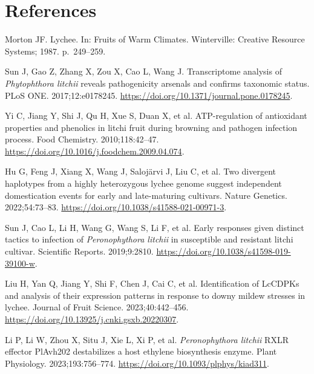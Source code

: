 \documentclass[referee,pdflatex,sn-basic,Numbered]{sn-jnl}
\begin{document}
\section*{References}

\begin{enumerate}[label={[\arabic*]},itemsep=2pt,leftmargin=2.6em]
\item Morton JF. Lychee. In: Fruits of Warm Climates. Winterville: Creative Resource Systems; 1987. p.~249--259.

\item Sun J, Gao Z, Zhang X, Zou X, Cao L, Wang J. Transcriptome analysis of \textit{Phytophthora litchii} reveals pathogenicity arsenals and confirms taxonomic status. PLoS ONE. 2017;12:e0178245. \url{https://doi.org/10.1371/journal.pone.0178245}.

\item Yi C, Jiang Y, Shi J, Qu H, Xue S, Duan X, et al. ATP-regulation of antioxidant properties and phenolics in litchi fruit during browning and pathogen infection process. Food Chemistry. 2010;118:42--47. \url{https://doi.org/10.1016/j.foodchem.2009.04.074}.

\item Hu G, Feng J, Xiang X, Wang J, Saloj\"arvi J, Liu C, et al. Two divergent haplotypes from a highly heterozygous lychee genome suggest independent domestication events for early and late-maturing cultivars. Nature Genetics. 2022;54:73--83. \url{https://doi.org/10.1038/s41588-021-00971-3}.

\item Sun J, Cao L, Li H, Wang G, Wang S, Li F, et al. Early responses given distinct tactics to infection of \textit{Peronophythora litchii} in susceptible and resistant litchi cultivar. Scientific Reports. 2019;9:2810. \url{https://doi.org/10.1038/s41598-019-39100-w}.

\item Liu H, Yan Q, Jiang Y, Shi F, Chen J, Cai C, et al. Identification of LcCDPKs and analysis of their expression patterns in response to downy mildew stresses in lychee. Journal of Fruit Science. 2023;40:442--456. \url{https://doi.org/10.13925/j.cnki.gsxb.20220307}.

\item Li P, Li W, Zhou X, Situ J, Xie L, Xi P, et al. \textit{Peronophythora litchii} RXLR effector PlAvh202 destabilizes a host ethylene biosynthesis enzyme. Plant Physiology. 2023;193:756--774. \url{https://doi.org/10.1093/plphys/kiad311}.


\end{enumerate}
\end{document}
